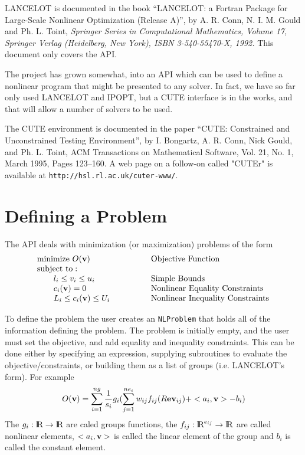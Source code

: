 \documentclass[12pt]{article}
\def\R{\hbox{\rm I\kern-.2150em R}}
\def\into{\rightarrow}
\begin{document}
    LANCELOT is documented in the book ``LANCELOT: a Fortran Package for
    Large-Scale Nonlinear Optimization (Release A)'', by A. R. Conn, 
    N. I. M. Gould and Ph. L. Toint, {\it Springer Series in Computational 
    Mathematics, Volume 17, Springer Verlag (Heidelberg, New York), 
    ISBN 3-540-55470-X, 1992.} This document only covers the API.

    The project has grown somewhat, into an API which can be used to define a
    nonlinear program that might be presented to any solver.
    In fact, we have so far only used LANCELOT and IPOPT, but a CUTE interface
    is in the works, and that will allow a number of solvers to be used.

    The CUTE environment is documented in the paper ``CUTE: Constrained and Unconstrained
    Testing Environment'', by I. Bongartz, A. R. Conn, Nick Gould, and Ph. L. Toint,
    ACM Transactions on Mathematical Software, Vol. 21, No. 1, March 1995, Pages 123--160.
    A web page on a follow-on called "CUTEr" is available at {\tt http://hsl.rl.ac.uk/cuter-www/}.

   \section{Defining a Problem}

   The API deals with minimization (or maximization) problems of the form
   \begin{displaymath}
     \begin{array}{ll}
      {\rm minimize}~O({\bf v})& \qquad\qquad \rm Objective~Function\\
      {\rm subject~to:}\\
      \qquad l_i \leq v_i \leq u_i& \qquad\qquad  \rm Simple~Bounds\\
      \qquad c_i({\bf v}) = 0& \qquad\qquad \rm Nonlinear~Equality
                                                      ~Constraints\\
      \qquad L_i \leq c_i({\bf v}) \leq U_i& \qquad\qquad \rm Nonlinear
                                                      ~Inequality~Constraints\\
     \end{array}
   \end{displaymath}

     To define the problem the user creates an {\tt NLProblem} that
    holds all of the information defining the problem. The problem is initially
    empty, and the user must set the objective, and add equality and inequality constraints.
    This can be done either by specifying an expression, supplying subroutines to evaluate the
    objective/constraints, or building them as a list of groups (i.e. LANCELOT's form). For example
    \begin{displaymath}
     O({\bf v}) = \sum_{i=1}^{ng} {1\over s_i}g_i( \sum_{j=1}^{ne_i} w_{ij} f_{ij}(R {\bf ev}_{ij}) 
             + <a_i,{\bf v}> - b_i)
    \end{displaymath}
    The $g_i:\R\into\R$ are caled groups functions, the $f_{ij}:\R^{e_{ij}}\into\R$ are called nonlinear
    elements, $<a_i,{\bf v}>$ is called the linear element of the group and $b_i$ is called 
    the constant element.
\end{document}
